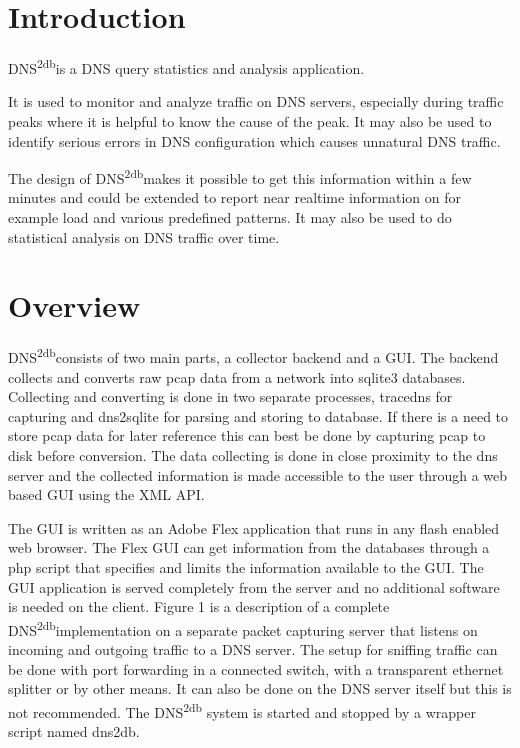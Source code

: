\documentclass[a4paper]{article}
\newcommand{\dnsdb}{DNS\textsuperscript{2db}\hspace{3pt}}
\begin{document}
\newpage
\tableofcontents
\newpage



\section{Introduction}
\dnsdb is a DNS query statistics and analysis application.

It is used to monitor and analyze traffic on DNS servers, especially during traffic peaks where it is
helpful to know the cause of the peak. It may also be used to identify serious errors in DNS
configuration which causes unnatural DNS traffic. 

The design of \dnsdb makes it possible to get this information within a few 
minutes and could be extended to report near realtime information on
for example load and various predefined patterns. It may also be used to 
do statistical analysis on DNS traffic over time.
    

\section{Overview}
\dnsdb consists of two main parts, a collector backend and a GUI.
The backend collects and converts raw pcap data from a network into sqlite3 databases. Collecting
and converting is done in two separate processes, tracedns for capturing and dns2sqlite for parsing
and storing to database. If there is a need to store pcap data for later reference this can best be done
by capturing pcap to disk before conversion. The data collecting is done in close proximity to the
dns server and the collected information is made accessible to the user through a web based GUI
using the XML API.

The GUI is written as an Adobe Flex application that runs in any flash enabled web browser. The
Flex GUI can get information from the databases through a php script that specifies and limits the
information available to the GUI. The GUI application is served completely from the server and no
additional software is needed on the client.
Figure 1 is a description of a complete \dnsdb implementation on a separate packet capturing
server that listens on incoming and outgoing traffic to a DNS server. The setup for sniffing traffic
can be done with port forwarding in a connected switch, with a transparent ethernet splitter or by
other means. It can also be done on the DNS server itself but this is not recommended. The \dnsdb
system is started and stopped by a wrapper script named dns2db.
\end{document}
